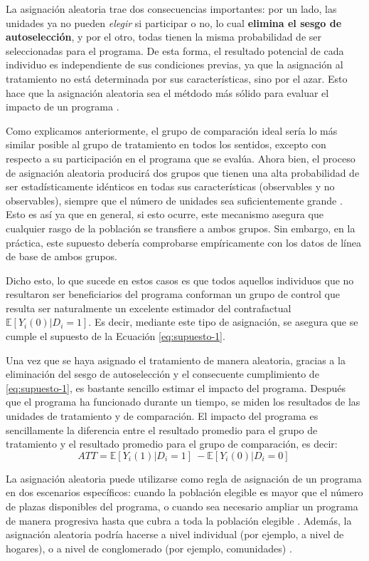\documentclass[../../main.tex]{subfiles}
\begin{document}
La asignación aleatoria trae dos consecuencias importantes: por un lado, las unidades ya
no pueden \textit{elegir} si participar o no, lo cual \textbf{elimina el sesgo de
autoselección}, y por el otro, todas tienen la misma probabilidad de ser seleccionadas
para el programa. De esta forma, el resultado potencial de cada individuo es independiente
de sus condiciones previas, ya que la asignación al tratamiento no está determinada por
sus características, sino por el azar. Esto hace que la asignación aleatoria sea el
métdodo más sólido para evaluar el impacto de un programa \cite{gertler-2016}.

Como explicamos anteriormente, el grupo de comparación ideal sería lo más similar posible
al grupo de tratamiento en todos los sentidos, excepto con respecto a su participación en
el programa que se evalúa. Ahora bien, el proceso de asignación aleatoria producirá dos
grupos que tienen una alta probabilidad de ser estadísticamente idénticos en todas sus
características (observables y no observables), siempre que el número de unidades sea
suficientemente grande \cite{gertler-2016}. Esto es así ya que en general, si esto ocurre,
este mecanismo asegura que cualquier rasgo de la población se transfiere a ambos grupos.
Sin embargo, en la práctica, este supuesto debería comprobarse empíricamente con los datos
de línea de base de ambos grupos.

Dicho esto, lo que sucede en estos casos es que todos aquellos individuos que no
resultaron ser beneficiarios del programa conforman un grupo de control que resulta ser
naturalmente un excelente estimador del contrafactual \(\mathbb{E}
\left[Y_i(0)|D_i=1\right]\). Es decir, mediante este tipo de asignación, se asegura que se
cumple el supuesto de la Ecuación \ref{eq:supuesto-1}.

Una vez que se haya asignado el tratamiento de manera aleatoria, gracias a la eliminación
del sesgo de autoselección y el consecuente cumplimiento de \ref{eq:supuesto-1}, es
bastante sencillo estimar el impacto del programa. Después que el programa ha funcionado
durante un tiempo, se miden los resultados de las unidades de tratamiento y de
comparación. El impacto del programa es sencillamente la diferencia entre el resultado
promedio para el grupo de tratamiento y el resultado promedio para el grupo de
comparación, es decir:
\[
    ATT = \mathbb{E} \left[Y_i(1)|D_i=1\right]\ - \mathbb{E} \left[Y_i(0)|D_i=0\right]\
\]

La asignación aleatoria puede utilizarse como regla de asignación de un programa en dos
escenarios específicos: cuando la población elegible es mayor que el número de plazas
disponibles del programa, o  cuando sea necesario ampliar un programa de manera progresiva
hasta que cubra a toda la población elegible \cite{gertler-2016}. Además, la asignación
aleatoria podría hacerse a nivel individual (por ejemplo, a nivel de hogares), o a nivel
de conglomerado (por ejemplo, comunidades) \cite{bernal}.
\end{document}
